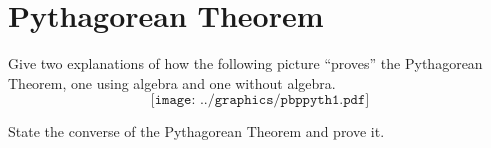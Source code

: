 \newpage

\section{Pythagorean Theorem}

\begin{prob}
Give two explanations of how the following picture ``proves''
  the Pythagorean Theorem, one using algebra and one without algebra. 
\[
\texttt{[image: ../graphics/pbppyth1.pdf]}
\]

\end{prob}

\vfill

\begin{prob}
State the converse of the Pythagorean Theorem and prove it.  
\end{prob}
